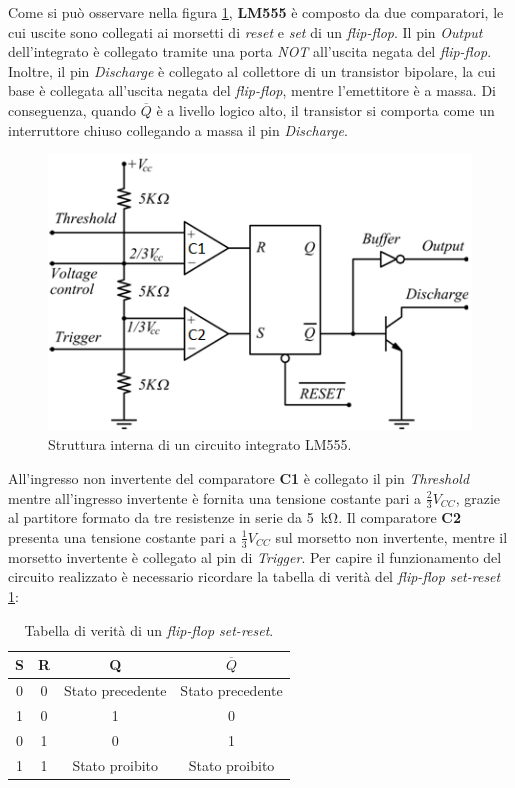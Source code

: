 \noindent
Come si può osservare nella figura \ref{fig:555_internals}, \textbf{LM555} è composto da due comparatori, le cui uscite sono collegati ai morsetti di \textit{reset} e \textit{set} di un \textit{flip-flop}. Il pin \textit{Output} dell'integrato è collegato tramite una porta \textit{NOT} all'uscita negata del \textit{flip-flop}. Inoltre, il pin \textit{Discharge} è collegato al collettore di un transistor bipolare, la cui base è collegata all'uscita negata del \textit{flip-flop}, mentre l'emettitore è a massa. Di conseguenza, quando \textbf{$\overline{Q}$} è a livello logico alto, il transistor si comporta come un interruttore chiuso collegando a massa il pin \textit{Discharge}. 

\begin{figure}[h!]
	\centering
	\includegraphics[width=0.6\linewidth]{./ImageFiles/Laboratorio 4/555internals.jpg}
	\caption{Struttura interna di un circuito integrato LM555.}
	\label{fig:555_internals}
\end{figure}

\noindent
All'ingresso non invertente del comparatore \textbf{C1} è collegato il pin \textit{Threshold}  mentre all'ingresso invertente è fornita una tensione costante pari a $\frac{2}{3}V_{CC}$, grazie al partitore formato da tre resistenze in serie da \SI{5}{\kilo\ohm}. Il comparatore \textbf{C2} presenta una tensione costante pari a $\frac{1}{3}V_{CC}$ sul morsetto non invertente, mentre il morsetto invertente è collegato al pin di \textit{Trigger}.
Per capire il funzionamento del circuito realizzato è necessario ricordare la tabella di verità del \textit{flip-flop set-reset} \ref{tab:flip_flop_states}:

\def\arraystretch{1.3}
\begin{table}[h!]
	\centering
	\begin{tabular}{|c|c|c|c|}
		\hline
		S	& R & Q & $\overline{Q}$\\ \hline
		0 & 0 & Stato precedente & Stato precedente  \\ \hline
		1 & 0 & 1 & 0\\ \hline
		0 & 1 & 0 & 1\\ \hline
		1 & 1 & Stato proibito & Stato proibito \\ \hline
	\end{tabular}
	\caption{Tabella di verità di un \textit{flip-flop set-reset}.}
	\label{tab:flip_flop_states}
\end{table}

